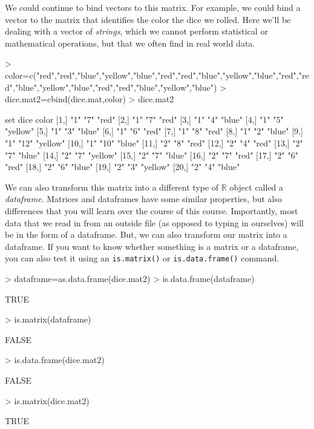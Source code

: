 \documentclass[12pt]{article}
\begin{document}
We could continue to bind vectors to this matrix. For example, we could bind a vector to the matrix that identifies the color the dice we rolled. Here we'll be dealing with a vector of \emph{strings}, which we cannot perform statistical or mathematical operations, but that we often find in real world data.
\begin{Schunk}
\begin{Sinput}
> color=c("red","red","blue","yellow","blue","red","red","blue","yellow","blue","red","red","blue","yellow","blue","red","red","blue","yellow","blue")
> dice.mat2=cbind(dice.mat,color)
> dice.mat2
\end{Sinput}
\begin{Soutput}
      set dice color   
 [1,] "1" "7"  "red"   
 [2,] "1" "7"  "red"   
 [3,] "1" "4"  "blue"  
 [4,] "1" "5"  "yellow"
 [5,] "1" "3"  "blue"  
 [6,] "1" "6"  "red"   
 [7,] "1" "8"  "red"   
 [8,] "1" "2"  "blue"  
 [9,] "1" "12" "yellow"
[10,] "1" "10" "blue"  
[11,] "2" "8"  "red"   
[12,] "2" "4"  "red"   
[13,] "2" "7"  "blue"  
[14,] "2" "7"  "yellow"
[15,] "2" "7"  "blue"  
[16,] "2" "7"  "red"   
[17,] "2" "6"  "red"   
[18,] "2" "6"  "blue"  
[19,] "2" "3"  "yellow"
[20,] "2" "4"  "blue"  
\end{Soutput}
\end{Schunk}

We can also transform this matrix into a different type of $\mathbb{R}$ object called a \emph{dataframe}. Matrices and dataframes have some similar properties, but also differences that you will learn over the course of this course. Importantly, most data that we read in from an outside file (as opposed to typing in ourselves) will be in the form of a dataframe. But, we can also transform our matrix into a dataframe. If you want to know whether something is a matrix or a dataframe, you can also test it using an \verb|is.matrix()| or \verb|is.data.frame()| command.
\begin{Schunk}
\begin{Sinput}
> dataframe=as.data.frame(dice.mat2)
> is.data.frame(dataframe)
\end{Sinput}
\begin{Soutput}
[1] TRUE
\end{Soutput}
\begin{Sinput}
> is.matrix(dataframe)
\end{Sinput}
\begin{Soutput}
[1] FALSE
\end{Soutput}
\begin{Sinput}
> is.data.frame(dice.mat2)
\end{Sinput}
\begin{Soutput}
[1] FALSE
\end{Soutput}
\begin{Sinput}
> is.matrix(dice.mat2)
\end{Sinput}
\begin{Soutput}
[1] TRUE
\end{Soutput}
\end{Schunk}
\end{document}
